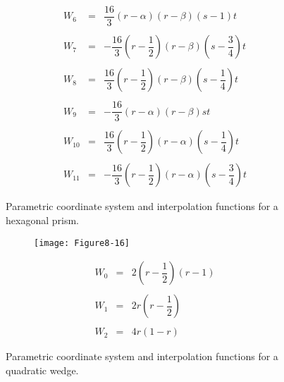 \begin{description}[leftmargin=0cm,labelindent=0cm]
\begin{figure}[!htb]
\begin{subfigure}{0.48\linewidth}
\begin{equation*}
\begin{array}{lll}
            W_6 &=& \dfrac{16}{3}(r - \alpha)(r - \beta)(s - 1)t \\ \\
            W_7 &=&-\dfrac{16}{3}(r - \dfrac{1}{2})(r - \beta)(s - \dfrac{3}{4})t \\ \\
            W_8 &=&  \dfrac{16}{3}(r - \dfrac{1}{2})(r - \beta)(s - \dfrac{1}{4})t \\ \\
            W_9 &=& -\dfrac{16}{3}(r - \alpha)(r - \beta)st \\ \\
            W_{10} &=&  \dfrac{16}{3}(r - \dfrac{1}{2})(r - \alpha)(s - \dfrac{1}{4})t \\ \\
            W_{11} &=& -\dfrac{16}{3}(r - \dfrac{1}{2})(r - \alpha)(s - \dfrac{3}{4})t
            \end{array}
            \end{equation*}
        \end{subfigure}%
    \caption{Parametric coordinate system and interpolation functions for a hexagonal prism.}
    \label{fig:Figure8-15}
    \end{figure}

    \begin{figure}[!htb]
        \centering
        \begin{subfigure}{0.48\linewidth}
            \centering
            \texttt{[image: Figure8-16]}
            \caption*{}
        \end{subfigure}
        \hfill
        \begin{subfigure}{0.48\linewidth}
            \centering
            \begin{equation*}
            \begin{array}{lll}
            W_0 &=& 2 \left( r - \dfrac{1}{2}\right)(r - 1) \\ \\
            W_1 &=& 2 r \left( r - \dfrac{1}{2}\right) \\ \\
            W_2 &=& 4 r (1 - r)
            \end{array}
            \end{equation*}
        \end{subfigure}%
        \caption{Parametric coordinate system and interpolation functions for a quadratic wedge.}
        \label{fig:Figure8-16}
    \end{figure}


\end{description}
